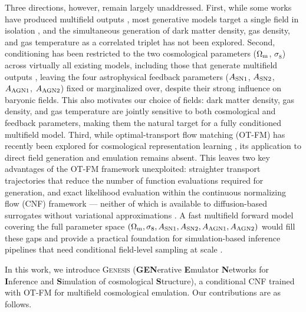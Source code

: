 \documentclass[usenatbib]{mnras}
\newcommand{\Om}{\Omega_{\rm m}}
\newcommand{\sig}{\sigma_8}
\begin{document}
Three directions, however, remain largely unaddressed. First, while
some works have produced multifield outputs
\citep{Andrianomena2022,Andrianomena2024}, most generative models
target a single field in isolation
\citep{Hassan2021HIFlow,Mudur2022DDPM,Hassan2023HIDM,Mudur2024}, and
the simultaneous generation of dark matter density, gas density, and
gas temperature as a correlated triplet has not been explored.
Second, conditioning has been restricted to the two cosmological
parameters ($\Om$, $\sig$) across virtually all existing models,
including those that generate multifield outputs
\citep{Andrianomena2022,Andrianomena2024}, leaving the four
astrophysical feedback parameters
($A_{\rm SN1}$, $A_{\rm SN2}$, $A_{\rm AGN1}$, $A_{\rm AGN2}$) fixed
or marginalized over, despite their strong influence on baryonic
fields. This also motivates our choice of fields: dark matter density,
gas density, and gas temperature are jointly sensitive to both
cosmological and feedback parameters, making them the natural target
for a fully conditioned multifield model. Third, while
optimal-transport flow matching (OT-FM) has recently been explored for
cosmological representation learning \citep{Kannan2025}, its
application to direct field generation and emulation remains absent.
This leaves two key advantages of the OT-FM framework unexploited:
straighter transport trajectories that reduce the number of function
evaluations required for generation, and exact likelihood evaluation
within the continuous normalizing flow (CNF) framework
\citep{Chen2018} --- neither of which is
available to diffusion-based surrogates without variational
approximations \citep{Lipman2023}. A fast multifield forward model covering
the full parameter space
$(\Om, \sig, A_{\rm SN1}, A_{\rm SN2}, A_{\rm AGN1}, A_{\rm AGN2})$
would fill these gaps and provide a practical foundation for
simulation-based inference \citep[SBI;][]{Cranmer2020} pipelines that
need conditional field-level sampling at scale
\citep{Mudur2024DiffHMC}.

In this work, we introduce \textsc{Genesis}
(\textbf{GEN}erative \textbf{E}mulator \textbf{N}etworks for
\textbf{I}nference and \textbf{S}imulation of cosmological
\textbf{S}tructure), a conditional
CNF trained with OT-FM for multifield cosmological emulation. Our
contributions are as follows.
\end{document}
